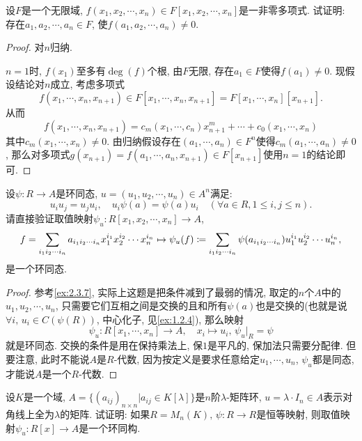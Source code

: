 \begin{problem}
    设$F$是一个无限域, $f(x_1, x_2, \cdots ,x_n) \in F[x_1, x_2, \cdots,x_n]$是一非零多项式. 试证明: 存在$a_1, a_2, \cdots, a_n \in F$, 使$f(a_1, a_2, \cdots, a_n) \neq 0$.
\end{problem}

\begin{proof}
    对$n$归纳.
    
    $n = 1$时, $f(x_1)$至多有$\deg(f)$个根, 由$F$无限, 存在$a_1 \in F$使得$f(a_1) \neq 0$. 现假设结论对$n$成立, 考虑多项式
    \[
        f(x_1, \cdots, x_n, x_{n + 1}) \in F[x_1, \cdots, x_n, x_{n + 1}] = F[x_1, \cdots, x_n][x_{n + 1}].
    \]
    从而
    \[
        f(x_1, \cdots, x_n, x_{n + 1}) = c_m(x_1, \cdots, c_n)x_{n + 1}^m + \cdots + c_0(x_1, \cdots, x_n)
    \]
    其中$c_m(x_1, \cdots, x_n) \neq 0$. 由归纳假设存在$(a_1, \cdots, a_n) \in F^n$使得$c_m(a_1, \cdots, a_n) \neq 0$, 那么对多项式$g(x_{n + 1}) = f(a_1, \cdots, a_n, x_{n + 1}) \in F[x_{n + 1}]$使用$n = 1$的结论即可.
\end{proof}

\begin{problem}\label{ex:2.4.5}
    设$\psi:R \to A$是环同态, $u = (u_1, u_2, \cdots, u_n) \in A^n$满足:
    \[
        u_iu_j = u_ju_i,\quad u_i\psi(a) = \psi(a)u_i \quad (\forall a \in R, 1 \leqslant i, j \leqslant n).
    \]
    请直接验证取值映射$\psi_u:R[x_1, x_2, \cdots, x_n] \to A$,
    \[
        f = \sum_{i_1i_2\cdots i_n} a_{i_1i_2\cdots i_n}x_1^{i_1}x_2^{i_2}\cdots x_n^{i_n} \mapsto \psi_u(f) \mathrel{\coloneqq} \sum_{i_1i_2\cdots i_n} \psi(a_{i_1i_2\cdots i_n})u_1^{i_1}u_2^{i_2}\cdots u_n^{i_n},
    \]
    是一个环同态.
\end{problem}

\begin{proof}
    参考\ref{ex:2.3.7}, 实际上这题是把条件减到了最弱的情况, 取定的$n$个$A$中的$u_1, u_2, \cdots, u_n$, 只需要它们互相之间是交换的且和所有$\psi(a)$也是交换的(也就是说$\forall i,\, u_i \in C(\psi(R))$, 中心化子, 见\ref{ex:1.2.4}), 那么映射
    \[
        \psi_u:R[x_1, \cdots, x_n] \to A,\quad x_i \mapsto u_i,\,  \psi_u|_R = \psi
    \]
    就是环同态. 交换的条件是用在保持乘法上, 保$1$是平凡的, 保加法只需要分配律. 但要注意, 此时不能说$A$是$R$-代数, 因为按定义是要求任意给定$u_1, \cdots, u_n$, $\psi_u$都是同态, 才能说$A$是一个$R$-代数.
\end{proof}

\begin{problem}\label{ex:2.4.6}
    设$K$是一个域, $A = \{(a_{ij})_{n \times n}|a_{ij} \in K[\lambda]\}$是$n$阶$\lambda$-矩阵环, $u = \lambda \cdot I_n \in A$表示对角线上全为$\lambda$的矩阵. 试证明: 如果$R = M_n(K),\, \psi:R \to R$是恒等映射, 则取值映射$\psi_u:R[x] \to A$是一个环同构.
\end{problem}

